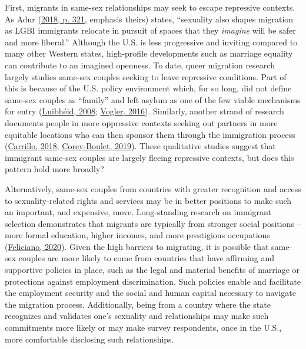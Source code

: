 \documentclass[
  11pt,
]{article}
\begin{document}
First, migrants in same-sex relationships may seek to escape repressive contexts. As Adur (\protect\hyperlink{ref-adur_2018}{2018, p. 321}, emphasis theirs) states, ``sexuality also shapes migration as LGBI immigrants relocate in pursuit of spaces that they \emph{imagine} will be safer and more liberal.'' Although the U.S. is less progressive and inviting compared to many other Western states, high-profile developments such as marriage equality can contribute to an imagined openness. To date, queer migration research largely studies same-sex couples seeking to leave repressive conditions. Part of this is because of the U.S. policy environment which, for so long, did not define same-sex couples as ``family'' and left asylum as one of the few viable mechanisms for entry (\protect\hyperlink{ref-luibheid_2008}{Luibhéid, 2008}; \protect\hyperlink{ref-vogler_2016}{Vogler, 2016}). Similarly, another strand of research documents people in more oppressive contexts seeking out partners in more equitable locations who can then sponsor them through the immigration process (\protect\hyperlink{ref-carrillo_2018}{Carrillo, 2018}; \protect\hyperlink{ref-corey-boulet_2019}{Corey-Boulet, 2019}). These qualitative studies suggest that immigrant same-sex couples are largely fleeing repressive contexts, but does this pattern hold more broadly?

Alternatively, same-sex couples from countries with greater recognition and access to sexuality-related rights and services may be in better positions to make such an important, and expensive, move. Long-standing research on immigrant selection demonstrates that migrants are typically from stronger social positions -- more formal education, higher incomes, and more prestigious occupations (\protect\hyperlink{ref-feliciano_2020}{Feliciano, 2020}). Given the high barriers to migrating, it is possible that same-sex couples are more likely to come from countries that have affirming and supportive policies in place, such as the legal and material benefits of marriage or protections against employment discrimination. Such policies enable and facilitate the employment security and the social and human capital necessary to navigate the migration process. Additionally, being from a country where the state recognizes and validates one's sexuality and relationships may make such commitments more likely or may make survey respondents, once in the U.S., more comfortable disclosing such relationships.
\end{document}
